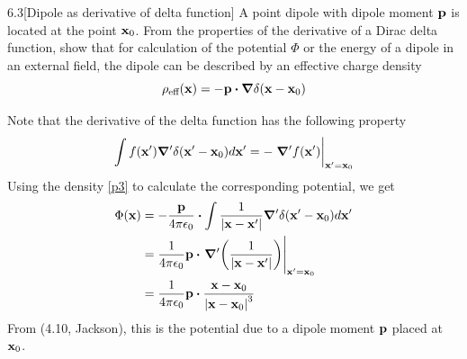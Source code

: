 \documentclass[12pt]{article}
\begin{document}
\begin{problem}{6.3}[Dipole as derivative of delta function]
A point dipole with dipole moment $\vb{p}$ is located at the point $\vb{x}_0$.
From the properties of the derivative of a Dirac delta function, show that for
calculation of the potential $\Phi$ or the energy of a dipole in an external
field, the dipole can be described by an effective charge density
\begin{equation}\label{p3}
    \rho_{\text{eff}}(\vb{x})=-\vb{p}\vdot\grad\delta(\vb{x}-\vb{x}_0) 
\end{equation}
\begin{solution}
Note that the derivative of the delta function has the following property
\begin{equation}
    \int f(\vb{x}')\grad'\delta(\vb{x}'-\vb{x}_0)d\vb{x}'
    =-\eval{\grad'f(\vb{x}')}_{\vb{x}'=\vb{x}_0}
\end{equation}
Using the density \eqref{p3} to calculate the corresponding potential, we get
\begin{align}
    \Phi(\vb{x})
    &=-\frac{\vb{p}}{4\pi\epsilon_0}\vdot
    \int\frac1{\abs{\vb{x}-\vb{x}'}}\grad'\delta(\vb{x}'-\vb{x}_0)d\vb{x}'\notag\\
    &=\frac1{4\pi\epsilon_0}\vb{p}\vdot
    \eval{\grad'\qty(\frac1{\abs{\vb{x}-\vb{x}'}})}_{\vb{x}'=\vb{x}_0}\notag\\
    &=\frac1{4\pi\epsilon_0}\vb{p}\vdot\frac{\vb{x}-\vb{x}_0}{\abs{\vb{x}-\vb{x}_0}^3}
\end{align}
From (4.10, Jackson), this is the potential due to a dipole moment $\vb{p}$
placed at $\vb{x}_0$.
\end{solution}
\end{problem}
\end{document}
